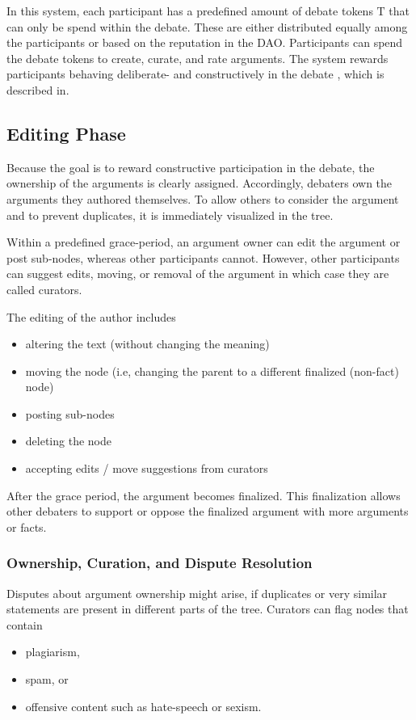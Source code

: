 \documentclass[%
aip,
amsmath,amssymb,
reprint,%
unsortedaddress,
nofootinbib
]{revtex4-2}
\newcommand{\T}{\text{T}}\newcommand{\debateTokens}{debate tokens}
\begin{document}
In this system, 
each participant has a predefined amount of \debateTokens{} $\T$ that can only be spend within the debate.
These are either distributed equally among the participants or based on the reputation in the \ac{DAO}.
%
Participants can spend the \debateTokens{} 
to create, curate, and rate arguments.
%
The system rewards participants behaving deliberate- and constructively in the debate
, which is described in.

\subsection{Editing Phase}\label{sec:EditingPhase}
Because the goal is to reward constructive participation in the debate, 
the ownership of the arguments is clearly assigned.
Accordingly, debaters own the arguments they authored themselves.
To allow others to consider the argument and to prevent duplicates, it is immediately visualized in the tree.

Within a predefined grace-period, an argument owner can edit the argument or post sub-nodes, 
whereas other participants cannot.
However, other participants can suggest edits, moving, or removal of the argument in which case they are called curators.

The editing of the author includes 
\begin{itemize}[noitemsep]
	\item altering the text (without changing the meaning) %
	\item moving the node (i.e, changing the parent to a different finalized (non-fact) node)%
	\item posting sub-nodes
	\item deleting the node
	\item accepting edits / move suggestions from curators
\end{itemize}
After the grace period, the argument becomes finalized.
This finalization allows other debaters to support or oppose the finalized argument with more arguments or facts.


\subsubsection*{Ownership, Curation, and Dispute Resolution}
Disputes about argument ownership might arise, 
if duplicates or very similar statements are present in different parts of the tree.
%
Curators can flag nodes that contain
\begin{itemize}[noitemsep]
\item plagiarism, 
\item spam, or 
\item offensive content such as hate-speech or sexism.
\end{itemize}
\end{document}
